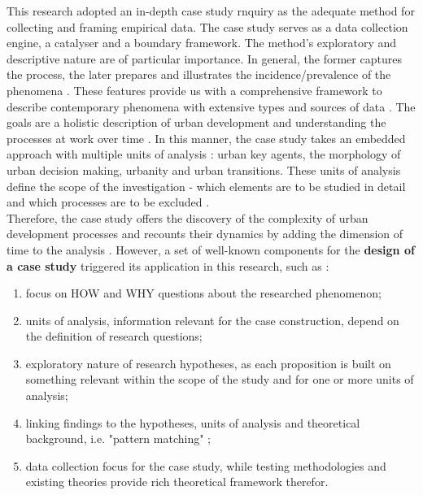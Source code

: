 \documentclass[11pt]{report}
\begin{document}
This research adopted an in-depth case study rnquiry as the adequate method for collecting and framing empirical data. The case study serves as a data collection engine, a catalyser and a boundary framework. The method's exploratory and descriptive nature are of particular importance. In general, the former captures the process, the later prepares and illustrates the incidence/prevalence of the phenomena . These features provide us with a comprehensive framework to describe contemporary phenomena with extensive types and sources of data . The goals are a holistic description of urban development and understanding the processes at work over time . In this manner, the case study takes an embedded approach with multiple units of analysis : urban key agents, the morphology of urban decision making, urbanity and urban transitions. These units of analysis define the scope of the investigation - which elements are to be studied in detail and which processes are to be excluded .
\\
Therefore, the case study offers the discovery of the complexity of urban development processes and recounts their dynamics by adding the dimension of time to the analysis . However, a set of well-known components for the \textbf{design of a case study} triggered its application in this research, such as :
\begin{enumerate}
\item focus on HOW and WHY questions about the researched phenomenon;
\item units of analysis, information relevant for the case construction, depend on the definition of research questions;
\item exploratory nature of research hypotheses, as each proposition is built on something relevant within the scope of the study and for one or more units of analysis;
\item linking findings to the hypotheses, units of analysis and theoretical background, i.e. "pattern matching" ;
\item data collection focus for the case study, while testing methodologies and existing theories provide rich theoretical framework therefor.
\end{enumerate}
\end{document}
